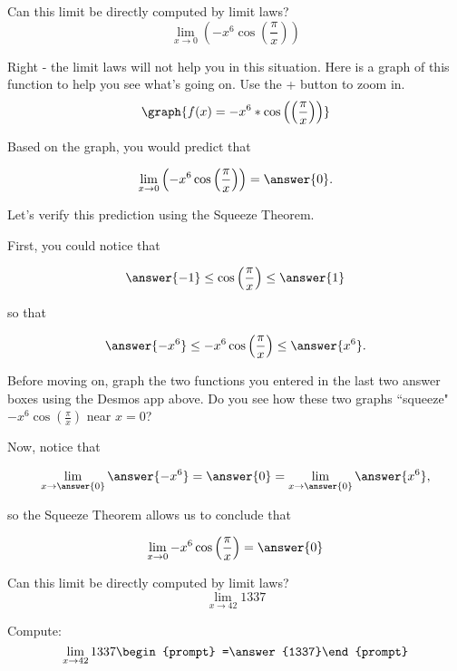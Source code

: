 \documentclass[handout]{ximera}
\begin{document}
\begin{exercise}
Can this limit be directly computed by limit laws?
  \[
  \displaystyle\lim_{x\to 0} \left(-x^6\cos\left(\frac{\pi}{x}\right)\right)
  \]
  
  \begin{multipleChoice}
  \end{multipleChoice}
  
\begin{exercise}
  
Right - the limit laws will not help you in this situation.  Here is a graph of this function to help you see what's going on.  Use the + button to zoom in.
  \[
   \graph{f(x)=-x^6*\cos\left(\left(\frac{\pi}{x}\right)\right)}
  \]
  
Based on the graph, you would predict that 

\[
  \displaystyle\lim_{x\to 0} \left(-x^6\cos\left(\frac{\pi}{x}\right)\right) = \answer{0}.
  \]
\begin{exercise}

Let's verify this prediction using the Squeeze Theorem.
 
First, you could notice that 

\[ \answer{-1} \leq \cos\left(\frac{\pi}{x}\right) \leq \answer{1} \]

so that
   
\[ \answer{-x^6} \leq -x^6\cos\left(\frac{\pi}{x}\right) \leq \answer{x^6}. \]

Before moving on, graph the two functions you entered in the last two answer boxes using the Desmos app above.  Do you see how these two graphs ``squeeze" $-x^6\cos\left(\frac{\pi}{x}\right)$ near $x=0$?

Now, notice that 

\[ \displaystyle\lim_{x \to \answer{0}} \answer{-x^6} = \answer{0} = \displaystyle\lim_{x \to \answer{0}} \answer{x^6},\]

so the Squeeze Theorem allows us to conclude that 

\[ \displaystyle\lim_{x \to 0}  -x^6\cos\left(\frac{\pi}{x}\right) = \answer{0} \]

\end{exercise}
\end{exercise}
\end{exercise}

\begin{exercise}
  Can this limit be directly computed by limit laws?
  \[
  \displaystyle\lim_{x\to 42} 1337
  \]
  \begin{multipleChoice}
  \end{multipleChoice}
\begin{question}
    Compute:
    \[
    \displaystyle\lim_{x\to 42} 1337 \begin{prompt} =\answer{1337}\end{prompt}
    \]
  \end{question}

\end{exercise}
\end{document}
